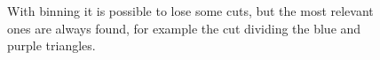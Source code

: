 \documentclass{PoliMi_MasterThesis}
\begin{document}
\begin{figure}[H]
    \centering
	\qquad
	\caption{With binning it is possible to lose some cuts, but the most relevant ones are always found, for example the cut dividing the blue and purple triangles.}
    \label{fig:triangles_splitting_binning}
\end{figure}
\end{document}
